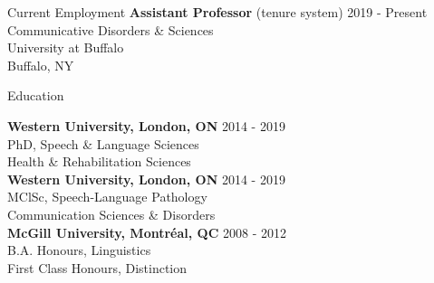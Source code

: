 \documentclass{resume} %
\begin{document}

\begin{rSection}{Current Employment}
{{\bf Assistant Professor} (tenure system)} \hfill {2019 - Present} \\
Communicative Disorders \& Sciences \\
University at Buffalo \\
Buffalo, NY

\end{rSection}

\begin{rSection}{Education}

{\bf Western University, London, ON} \hfill {2014 - 2019} \\ 
PhD, Speech \& Language Sciences  \\
Health \& Rehabilitation Sciences  \bigskip \\

{\bf Western University, London, ON} \hfill {2014 - 2019} \\ 
MClSc, Speech-Language Pathology  \\
Communication Sciences \& Disorders \bigskip \\

{\bf McGill University, Montr\'eal, QC} \hfill {2008 - 2012} \\
B.A. Honours, Linguistics \\
First Class Honours, Distinction

\end{rSection}
\end{document}
